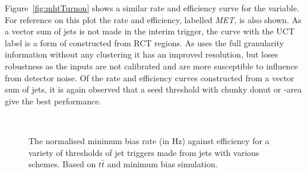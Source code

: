 Figure~\ref{fig:mhtTurnon} shows a similar rate and efficiency curve
for the \MHT variable. For reference on this plot the \MET rate and
efficiency, labelled \emph{MET}, is also shown. As a
vector sum of jets is not made in the interim trigger, the curve with
the UCT label is a form of \MET constructed from \ac{RCT} regions. As \MET
uses the full granularity \TT information without any clustering it
has an improved resolution, but loses robustness as the inputs are not
calibrated and are more susceptible to influence from detector noise.
Of the rate and efficiency curves constructed from a vector sum of
jets, it is again observed that a seed threshold with chunky donut or
\rho-area \PUS give the best performance.

\begin{figure}
  \centering
  ~ 
  \caption{ The normalised minimum bias rate (in Hz) against efficiency for a
  variety of thresholds of jet triggers
  made from jets with various \PUS schemes. Based on $t\bar{t}$ and
  minimum bias \MC simulation.}
  \label{fig:rateEffJet}
\end{figure}

